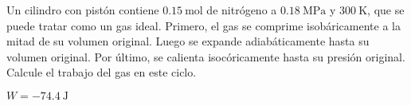 %
\begin{Exercise}
  Un cilindro con pistón contiene $\SI{0.15}{\mole}$ de nitrógeno a $\SI{0.18}{\mega\pascal}$ y $\SI{300}{\kelvin}$, que se puede tratar como un gas ideal. Primero, el gas se comprime isobáricamente a la mitad de su volumen original. Luego se expande adiabáticamente hasta su volumen original. Por último, se calienta isocóricamente hasta su presión original. Calcule el trabajo del gas en este ciclo.
\end{Exercise}
\begin{Answer}
	\begin{minipage}[t]{.4\textwidth}
    $W = \SI{-74.4}{\joule}$
  \end{minipage}
\end{Answer}
%
